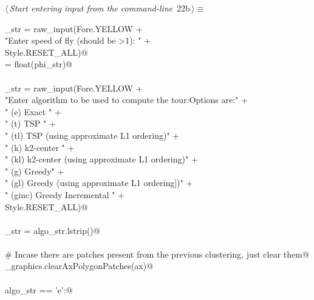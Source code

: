 \documentclass[11.5pt]{report}
\begin{document}
\newchunk 
\begin{flushleft} \small\label{scrap14}\raggedright\small
{} $\langle\,${\itshape Start entering input from the command-line}\nobreak\ {\footnotesize {22b}}$\,\rangle\equiv$
\vspace{-1ex}
\begin{list}{}{} \item
\mbox{}\verb@phi_str = raw_input(Fore.YELLOW + \@\\
\mbox{}\verb@          "Enter speed of fly (should be >1): " +\@\\
\mbox{}\verb@           Style.RESET_ALL)@\\
\mbox{}\verb@phi = float(phi_str)@\\
\mbox{}\verb@@\\
\mbox{}\verb@algo_str = raw_input(Fore.YELLOW + \@\\
\mbox{}\verb@          "Enter algorithm to be used to compute the tour:\n Options are:\n" +\@\\
\mbox{}\verb@        "  (e)   Exact \n"                                   +\@\\
\mbox{}\verb@        "  (t)   TSP   \n"                                   +\@\\
\mbox{}\verb@        "  (tl)  TSP   (using approximate L1 ordering)\n"    +\@\\
\mbox{}\verb@        "  (k)   k2-center   \n"                             +\@\\
\mbox{}\verb@        "  (kl)  k2-center (using approximate L1 ordering)\n"  +\@\\
\mbox{}\verb@        "  (g)   Greedy\n"                                   +\@\\
\mbox{}\verb@        "  (gl)  Greedy (using approximate L1 ordering])\n"  +\@\\
\mbox{}\verb@        "  (ginc) Greedy Incremental  "  +\@\\
\mbox{}\verb@        Style.RESET_ALL)@\\
\mbox{}\verb@@\\
\mbox{}\verb@algo_str = algo_str.lstrip()@\\
\mbox{}\verb@@\\
\mbox{}\verb@# Incase there are patches present from the previous clustering, just clear them@\\
\mbox{}\verb@utils_graphics.clearAxPolygonPatches(ax)@\\
\mbox{}\verb@@\\
\mbox{}\verb@if   algo_str == 'e':@\\

\end{list}
\end{flushleft}
\end{document}

